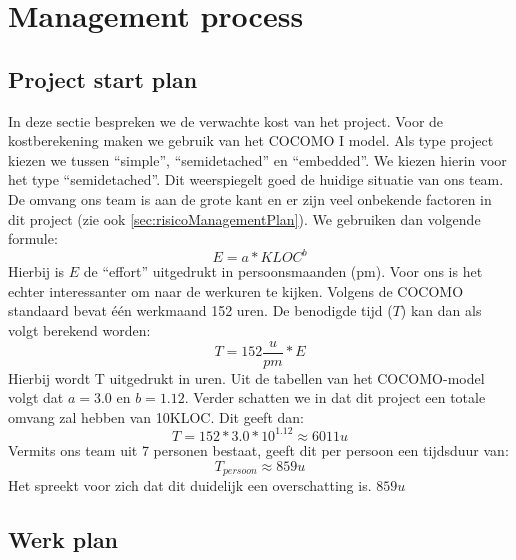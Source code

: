 \chapter{Management process}
\section{Project start plan}
In deze sectie bespreken we de verwachte kost van het project. Voor de kostberekening maken we gebruik van het COCOMO I model. Als type project kiezen we tussen ``simple'', ``semidetached'' en ``embedded''. We kiezen hierin voor het type ``semidetached''. Dit weerspiegelt goed de huidige situatie van ons team. De omvang ons team is aan de grote kant en er zijn veel onbekende factoren in dit project (zie ook \ref{sec:risicoManagementPlan}). We gebruiken dan volgende formule:
\begin{equation*}
	E = a*KLOC^b
\end{equation*}
Hierbij is $E$ de ``effort'' uitgedrukt in persoonsmaanden (pm). Voor ons is het echter interessanter om naar de werkuren te kijken. Volgens de COCOMO standaard bevat \'{e}\'{e}n werkmaand 152 uren.  De benodigde tijd ($T$) kan dan als volgt berekend worden:
\begin{equation*}
	T = 152\frac{u}{pm}*E
\end{equation*}
Hierbij wordt T uitgedrukt in uren. Uit de tabellen van het COCOMO-model volgt dat $a = 3.0$ en $b = 1.12$. Verder schatten we in dat dit project een totale omvang zal hebben van 10KLOC. Dit geeft dan:
\begin{equation*}
	T = 152*3.0*10^{1.12} \approx 6011u 
\end{equation*}
Vermits ons team uit 7 personen bestaat, geeft dit per persoon een tijdsduur van:
\begin{equation*}
	T_{persoon} \approx 859u
\end{equation*}
Het spreekt voor zich dat dit duidelijk een overschatting is. $859u$ 
\section{Werk plan} \label{sec:workplan}
